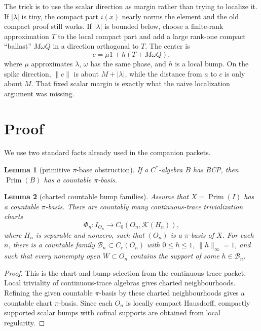 \documentclass[11pt]{article}
\newtheorem{lemma}{Lemma}
\newcommand{\Kcal}{\mathcal K}
\newcommand{\Prim}{\operatorname{Prim}}
\begin{document}
The trick is to use the scalar direction as margin rather than trying to
localize it.  If \(|\lambda|\) is tiny, the compact part \(i(x)\) nearly norms
the element and the old compact proof still works.  If \(|\lambda|\) is
bounded below, choose a finite-rank approximation \(T\) to the local compact
part and add a large rank-one compact ``ballast'' \(M\omega Q\) in a direction
orthogonal to \(T\).  The center is
\[
        c=\mu 1+h(T+M\omega Q),
\]
where \(\mu\) approximates \(\lambda\), \(\omega\) has the same phase, and
\(h\) is a local bump.  On the spike direction, \(\|c\|\) is about
\(M+|\lambda|\), while the distance from \(a\) to \(c\) is only about \(M\).
That fixed scalar margin is exactly what the naive localization argument was
missing.

\section*{Proof}

We use two standard facts already used in the companion packets.

\begin{lemma}[primitive \(\pi\)-base obstruction]
\label{lem:primitive}
If a \(C^*\)-algebra \(B\) has BCP, then \(\Prim(B)\) has a countable
\(\pi\)-basis.
\end{lemma}

\begin{lemma}[charted countable bump families]
\label{lem:charts}
Assume that \(X=\Prim(I)\) has a countable \(\pi\)-basis.  There are countably
many continuous-trace trivialization charts
\[
        \Phi_n:I_{O_n}\longrightarrow C_0(O_n,\Kcal(H_n)),
\]
where \(H_n\) is separable and nonzero, such that \((O_n)\) is a
\(\pi\)-basis of \(X\).  For each \(n\), there is a countable family
\(\mathcal B_n\subset C_c(O_n)\) with \(0\le h\le1\), \(\|h\|_\infty=1\),
and such that every nonempty open \(W\subset O_n\) contains the support of
some \(h\in\mathcal B_n\).
\end{lemma}

\begin{proof}
This is the chart-and-bump selection from the continuous-trace packet.  Local
triviality of continuous-trace algebras gives charted neighbourhoods.  Refining
the given countable \(\pi\)-basis by these charted neighbourhoods gives a
countable chart \(\pi\)-basis.  Since each \(O_n\) is locally compact
Hausdorff, compactly supported scalar bumps with cofinal supports are obtained
from local regularity.
\end{proof}
\end{document}
